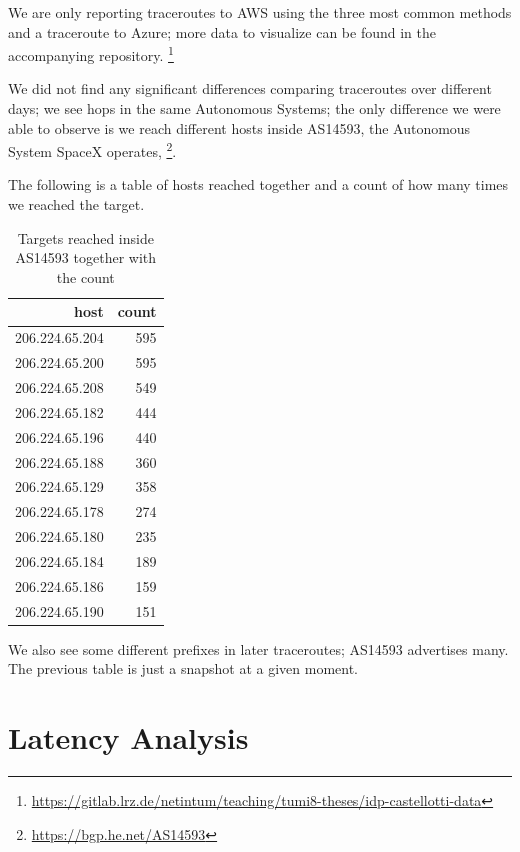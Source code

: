 \documentclass[IN,11pt,twoside,openright,idp,english]{tumthesis}
\begin{document}
We are only reporting traceroutes to AWS using the three most common methods and a traceroute to Azure; more data to visualize can be found in the accompanying repository. \footnote{\url{https://gitlab.lrz.de/netintum/teaching/tumi8-theses/idp-castellotti-data}}
    
We did not find any significant differences comparing traceroutes over different days; we see hops in the same Autonomous Systems; the only difference we were able to observe is we reach different hosts inside AS14593, the Autonomous System SpaceX operates, \footnote{\url{https://bgp.he.net/AS14593}}.
    
The following is a table of hosts reached together and a count of how many times we reached the target.
    
\begin{table}[]
    \centering
    \begin{tabular}{ r r }
        \toprule
            host           & count \\ 
            \midrule
            206.224.65.204 & 595   \\
            206.224.65.200 & 595   \\
            206.224.65.208 & 549   \\ 
            206.224.65.182 & 444   \\
            206.224.65.196 & 440   \\ 
            206.224.65.188 & 360   \\ 
            206.224.65.129 & 358   \\ 
            206.224.65.178 & 274   \\ 
            206.224.65.180 & 235   \\ 
            206.224.65.184 & 189   \\ 
            206.224.65.186 & 159   \\ 
            206.224.65.190 & 151   \\
            \bottomrule
    \end{tabular}
    \caption{Targets reached inside AS14593 together with the count}
\end{table}
    
We also see some different prefixes in later traceroutes; AS14593 advertises many. The previous table is just a snapshot at a given moment.
    
\section{Latency Analysis}
\end{document}
